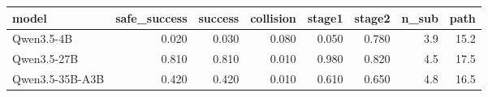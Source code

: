 \begin{tabular}{lrrrrrrr}
\toprule
model & safe_success & success & collision & stage1 & stage2 & n_sub & path \\
\midrule
Qwen3.5-4B & 0.020 & 0.030 & 0.080 & 0.050 & 0.780 & 3.9 & 15.2 \\
Qwen3.5-27B & 0.810 & 0.810 & 0.010 & 0.980 & 0.820 & 4.5 & 17.5 \\
Qwen3.5-35B-A3B & 0.420 & 0.420 & 0.010 & 0.610 & 0.650 & 4.8 & 16.5 \\
\bottomrule
\end{tabular}
